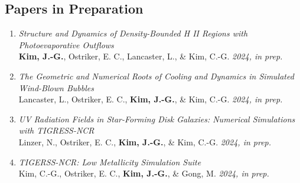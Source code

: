 \subsection{Papers in Preparation}
\begin{enumerate}
\item[] \textit{Structure and Dynamics of Density-Bounded H II Regions with Photoevaporative Outflows} \\ \textbf{Kim, J.-G.}, Ostriker, E. C., Lancaster, L., \& Kim, C.-G. \textit{2024, in prep.}
\item[] \textit{The Geometric and Numerical Roots of Cooling and Dynamics in Simulated Wind-Blown Bubbles} \\ Lancaster, L., Ostriker, E. C., \textbf{Kim, J.-G.}, \& Kim, C.-G. \textit{2024, in prep.}
\item[] \textit{UV Radiation Fields in Star-Forming Disk Galaxies: Numerical Simulations with TIGRESS-NCR} \\ Linzer, N., Ostriker, E. C., \textbf{Kim, J.-G.}, \& Kim, C.-G. \textit{2024, in prep.}
\item[] \textit{TIGERSS-NCR: Low Metallicity Simulation Suite} \\ Kim, C.-G., Ostriker, E. C., \textbf{Kim, J.-G.}, \& Gong, M. \textit{2024, in prep.}
\end{enumerate}

